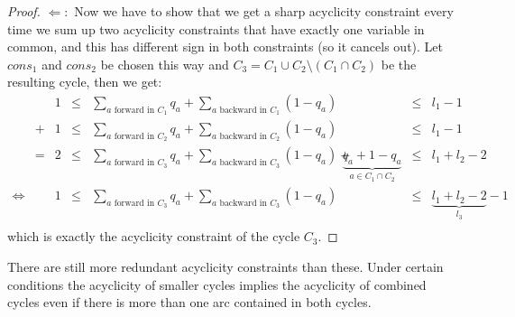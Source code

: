 \begin{proof}
$\Leftarrow :$ Now we have to show that we get a sharp acyclicity constraint every time we sum up two acyclicity 
constraints that have exactly one variable in common, and this has different sign in both constraints (so it cancels 
out). Let $cons_1$ and $cons_2$ be chosen this way and $C_3=C_1\cup C_2\setminus (C_1\cap C_2)$ be the resulting cycle, 
then we get:
\begin{align*}
 &&1&\le &\sum_{a \textrm{ forward in }C_1}q_a + \sum_{a\textrm{ backward in }C_1}{(1-q_a)}&&\le &l_1-1\\
 &+&1&\le &\sum_{a \textrm{ forward in }C_2}q_a + \sum_{a\textrm{ backward in }C_2}{(1-q_a)}&&\le &l_1-1\\
 &=&2&\le &\sum_{a \textrm{ forward in }C_3}q_a +\sum_{a\textrm{ backward in }C_3}{(1-q_a)}+
 &\underbrace{q_a+1-q_a}_{a\in C_1\cap C_2} &\le &l_1+l_2-2\\
 \iff &&1&\le &\sum_{a \textrm{ forward in }C_3}q_a +\sum_{a\textrm{ backward in }C_3}{(1-q_a)}
 &&\le &\underbrace{l_1+l_2-2}_{l_3}-1\\
\end{align*}
which is exactly the acyclicity constraint of the cycle $C_3$.
\end{proof}
There are still more redundant acyclicity constraints than these. Under certain conditions the acyclicity of smaller 
cycles implies the acyclicity of combined cycles even if there is more than one arc contained in both cycles.

